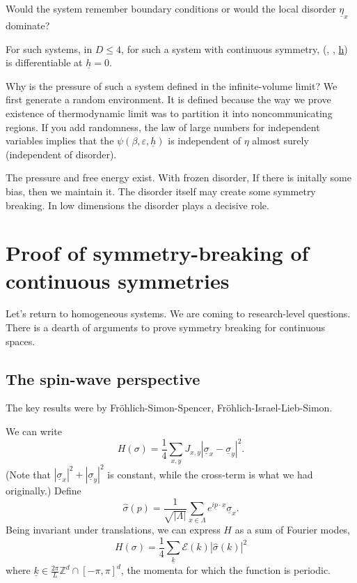 Would the system remember boundary conditions or would the local disorder $\underline{\eta}_x$ dominate?

\begin{theorem}
For such systems, in $D\le 4$, for such a system with continuous symmetry, 
\be
\psi(\beta, \varepsilon, \underline{h}) 
\ee
is differentiable at $\underline{h}=0$.
\end{theorem}
Why is the pressure of such a system defined in the infinite-volume limit? We first generate a random environment. 
It is defined because the way we prove existence of thermodynamic limit was to partition it into noncommunicating regions. If you add randomness, %
the law of large numbers for independent variables implies that the $\psi(\beta, \varepsilon, \underline{h})$ is independent of $\eta$ almost surely (independent of disorder). 

The pressure and free energy exist. With frozen disorder, 
If there is initally some bias, then we maintain it. The disorder itself may create some symmetry breaking. In low dimensions the disorder plays a decisive role.

\section{Proof of symmetry-breaking of continuous symmetries
}

Let's return to homogeneous systems. We are coming to research-level questions. There is a dearth of arguments to prove symmetry breaking for continuous spaces. 

\subsection{The spin-wave perspective}

The key results were by Fr\"ohlich-Simon-Spencer, Fr\"ohlich-Israel-Lieb-Simon.

We can write 
\begin{equation}\label{eq:csb-h1}
H(\sigma) = \frac{1}{4} \sum_{x,y} J_{x,y} |\underline{\sigma}_x - \underline{\sigma}_y|^2.
\end{equation}%
(Note that $|\underline{\sigma}_x|^2 + |\underline{\sigma}_y|^2$ is constant, while the cross-term is what we had originally.)
Define
\begin{equation}\label{eq:csb-f}
\widehat{\sigma} (p) = \frac{1}{\sqrt{|\Lambda|}} \sum_{x\in \Lambda} e^{i\underline{p} \cdot \underline{x}} \underline{\sigma}_x.
\end{equation}
Being invariant under translations, we can express $H$ as a sum of Fourier modes,
\begin{equation}\label{eq:csb-h}
H(\sigma) = \frac{1}{4}\sum_{\underline{k}} \mathcal{E}(k) |\widehat{\sigma}(k)|^2
\end{equation}
where $\underline{k} \in \frac{2\pi}{L}\mathbb{Z}^d \cap [-\pi, \pi]^d$,
the momenta for which the function is periodic.

